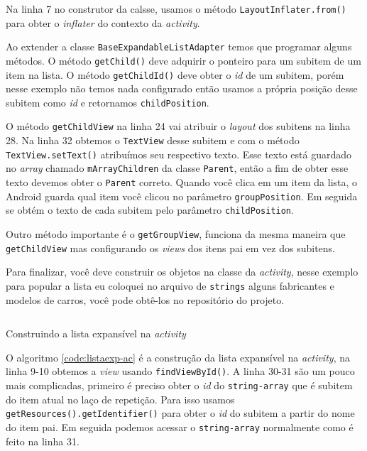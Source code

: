 \documentclass[a4paper,12pt,brazil]{book}
\begin{document}
\begin{singlespace}
Na linha 7 no construtor da calsse, usamos o método \texttt{LayoutInflater.from()} para obter o \emph{inflater} do contexto da \emph{activity}. 

Ao extender a classe \texttt{BaseExpandableListAdapter} temos que programar alguns métodos. O método \texttt{getChild()} deve adquirir o ponteiro para um subitem de um item na lista. O método \texttt{getChildId()} deve obter o \emph{id} de um subitem, porém nesse exemplo não temos nada configurado então usamos a própria posição desse subitem como \emph{id} e retornamos \texttt{childPosition}. 

O método \texttt{getChildView} na linha 24 vai atribuir o \emph{layout} dos subitens na linha 28. Na linha 32 obtemos o \texttt{TextView} desse subitem e com o método \texttt{TextView.setText()} atribuímos seu respectivo texto. Esse texto está guardado no \emph{array} chamado \texttt{mArrayChildren} da classe \texttt{Parent}, então a fim de obter esse texto devemos obter o \texttt{Parent} correto. Quando você clica em um item da lista, o Android guarda qual item você clicou no parâmetro \texttt{groupPosition}. Em seguida se obtém o texto de cada subitem pelo parâmetro \texttt{childPosition}.

Outro método importante é o \texttt{getGroupView}, funciona da mesma maneira que \texttt{getChildView} mas configurando os \emph{views} dos itens pai em vez dos subitens.

Para finalizar, você deve construir os objetos na classe da \emph{activity}, nesse exemplo para popular a lista eu coloquei no arquivo de \texttt{strings} alguns fabricantes e modelos de carros, você pode obtê-los no repositório do projeto.

\begin{listing}[H]
\inputminted[linenos=true,fontsize=\small,frame=lines, framesep=2mm, tabsize=2,numbersep=5pt]{java}{src/design/exlist-main.java}
\caption{Construindo a lista expansível na \emph{activity}}
\label{code:listaexp-ac}
\end{listing}	

\newpage

O algoritmo \ref{code:listaexp-ac} é a construção da lista expansível na \emph{activity}, na linha 9-10 obtemos a \emph{view} usando \texttt{findViewById()}. A linha 30-31 são um pouco mais complicadas, primeiro é preciso obter o \emph{id} do \texttt{string-array} que é subitem do item atual no laço de repetição. Para isso usamos \texttt{getResources().getIdentifier()} para obter o \emph{id} do subitem a partir do nome do item pai. Em seguida podemos acessar o \texttt{string-array} normalmente como é feito na linha 31.


\end{singlespace}
\end{document}
